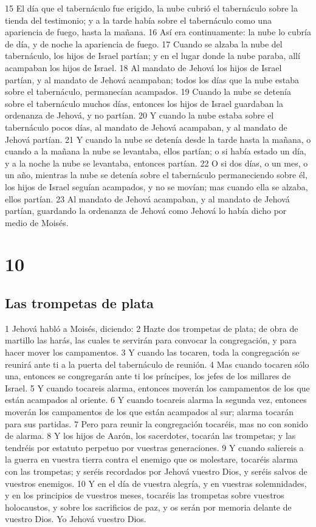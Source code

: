 15 El día que el tabernáculo fue erigido, la nube cubrió el tabernáculo sobre la tienda del testimonio; y a la tarde había sobre el tabernáculo como una apariencia de fuego, hasta la mañana.
16 Así era continuamente: la nube lo cubría de día, y de noche la apariencia de fuego.
17 Cuando se alzaba la nube del tabernáculo, los hijos de Israel partían; y en el lugar donde la nube paraba, allí acampaban los hijos de Israel.
18 Al mandato de Jehová los hijos de Israel partían, y al mandato de Jehová acampaban; todos los días que la nube estaba sobre el tabernáculo, permanecían acampados.
19 Cuando la nube se detenía sobre el tabernáculo muchos días, entonces los hijos de Israel guardaban la ordenanza de Jehová, y no partían.
20 Y cuando la nube estaba sobre el tabernáculo pocos días, al mandato de Jehová acampaban, y al mandato de Jehová partían.
21 Y cuando la nube se detenía desde la tarde hasta la mañana, o cuando a la mañana la nube se levantaba, ellos partían; o si había estado un día, y a la noche la nube se levantaba, entonces partían.
22 O si dos días, o un mes, o un año, mientras la nube se detenía sobre el tabernáculo permaneciendo sobre él, los hijos de Israel seguían acampados, y no se movían; mas cuando ella se alzaba, ellos partían.
23 Al mandato de Jehová acampaban, y al mandato de Jehová partían, guardando la ordenanza de Jehová como Jehová lo había dicho por medio de Moisés.

\chapter{10}

\section*{Las trompetas de plata }


1 Jehová habló a Moisés, diciendo:
2 Hazte dos trompetas de plata; de obra de martillo las harás, las cuales te servirán para convocar la congregación, y para hacer mover los campamentos.
3 Y cuando las tocaren, toda la congregación se reunirá ante ti a la puerta del tabernáculo de reunión.
4 Mas cuando tocaren sólo una, entonces se congregarán ante ti los príncipes, los jefes de los millares de Israel.
5 Y cuando tocareis alarma, entonces moverán los campamentos de los que están acampados al oriente.
6 Y cuando tocareis alarma la segunda vez, entonces moverán los campamentos de los que están acampados al sur; alarma tocarán para sus partidas.
7 Pero para reunir la congregación tocaréis, mas no con sonido de alarma.
8 Y los hijos de Aarón, los sacerdotes, tocarán las trompetas; y las tendréis por estatuto perpetuo por vuestras generaciones.
9 Y cuando saliereis a la guerra en vuestra tierra contra el enemigo que os molestare, tocaréis alarma con las trompetas; y seréis recordados por Jehová vuestro Dios, y seréis salvos de vuestros enemigos.
10 Y en el día de vuestra alegría, y en vuestras solemnidades, y en los principios de vuestros meses, tocaréis las trompetas sobre vuestros holocaustos, y sobre los sacrificios de paz, y os serán por memoria delante de vuestro Dios. Yo Jehová vuestro Dios.
